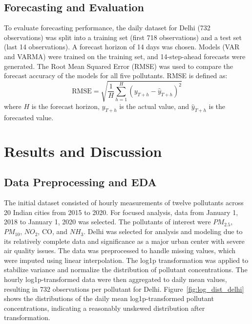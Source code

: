 \documentclass[fleqn,10pt]{SelfArx} %
\begin{document}
\subsection{Forecasting and Evaluation}
To evaluate forecasting performance, the daily dataset for Delhi (732 observations) was split into a training set (first 718 observations) and a test set (last 14 observations). A forecast horizon of 14 days was chosen.
Models (VAR and VARMA) were trained on the training set, and 14-step-ahead forecasts were generated. The Root Mean Squared Error (RMSE) was used to compare the forecast accuracy of the models for all five pollutants. RMSE is defined as:
\begin{equation}
\text{RMSE} = \sqrt{\frac{1}{H} \sum_{h=1}^{H} (y_{T+h} - \hat{y}_{T+h})^2}
\end{equation}
where $H$ is the forecast horizon, $y_{T+h}$ is the actual value, and $\hat{y}_{T+h}$ is the forecasted value.


\section{Results and Discussion}
\subsection{Data Preprocessing and EDA}
The initial dataset consisted of hourly measurements of twelve pollutants across 20 Indian cities from 2015 to 2020. For focused analysis, data from January 1, 2018 to January 1, 2020 was selected. The pollutants of interest were $PM_{2.5}$, $PM_{10}$, $NO_{2}$, CO, and $NH_{3}$.
Delhi was selected for analysis and modeling due to its relatively complete data and significance as a major urban center with severe air quality issues.
The data was preprocessed to handle missing values, which were imputed using linear interpolation. The log1p transformation was applied to stabilize variance and normalize the distribution of pollutant concentrations.
The hourly log1p-transformed data were then aggregated to daily mean values, resulting in 732 observations per pollutant for Delhi. Figure~\ref{fig:log_dist_delhi} shows the distributions of the daily mean log1p-transformed pollutant concentrations, indicating a reasonably unskewed distribution after transformation.
\end{document}
